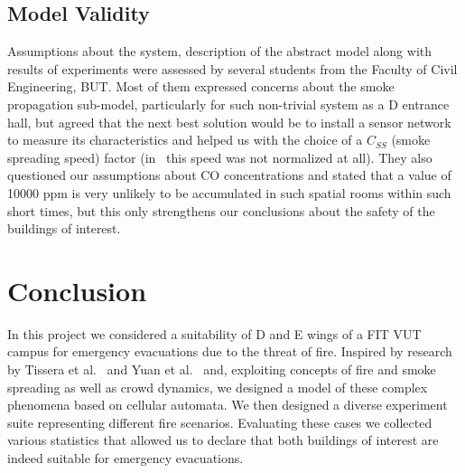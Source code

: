 \subsection{Model Validity}
Assumptions about the system, description of the abstract model along with
results of experiments were assessed by several students from the Faculty of
Civil Engineering, BUT.
Most of them expressed concerns about the smoke propagation sub-model,
particularly for such non-trivial system as a D entrance hall, but agreed
that the next best solution would be to install a sensor network to measure
its characteristics and helped us with the choice of a $C_{SS}$
(smoke spreading speed) factor (in~\cite{Tissera1} this speed was not
normalized at all).
They also questioned our assumptions about CO concentrations and stated that
a value of 10000 ppm is very unlikely to be accumulated in such spatial rooms
within such short times, but this only strengthens our conclusions about the
safety of the buildings of interest.

\section{Conclusion}
In this project we considered a suitability of D and E wings of a FIT VUT campus
for emergency evacuations due to the threat of fire.
Inspired by research by Tissera et al.~\cite{Tissera1, Tissera2} and
Yuan et al.~\cite{Yuan} and, exploiting concepts of fire and smoke spreading as
well as crowd dynamics, we designed a model of these complex phenomena based on
cellular automata.
We then designed a diverse experiment suite representing different fire
scenarios.
Evaluating these cases we collected various statistics that allowed us to
declare that both buildings of interest are indeed suitable for emergency
evacuations.
